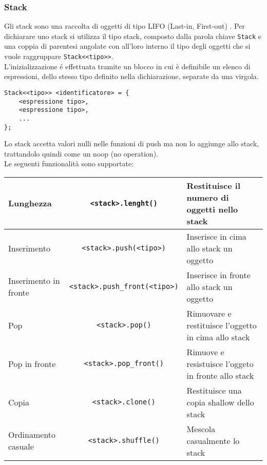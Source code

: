 \newpage
\subsubsection{Stack}
Gli stack sono una raccolta di oggetti di tipo LIFO (Last-in, First-out) \cite{CSharpLang}.
Per dichiarare uno stack si utilizza il tipo stack, composto dalla parola chiave \lstinline|Stack|
e una coppia di parentesi angolate con all'loro interno il tipo degli oggetti che si vuole raggruppare
\lstinline|Stack<<tipo>>|. \\
L'inizializzazione é effettuata tramite un blocco in cui è definibile un elenco di espressioni,
dello stesso tipo definito nella dichiarazione, separate da una virgola.
\begin{lstlisting}
Stack<<tipo>> <identificatore> = {
    <espressione tipo>,
    <espressione tipo>,
    ...
};
\end{lstlisting}
Lo stack accetta valori nulli nelle funzioni di push ma non lo aggiunge allo stack, trattandolo quindi
come un noop (no operation). \\ 
Le seguenti funzionalità sono supportate: 
\begin{center}
\begin{tabularx}{\linewidth}{|X|c|X|}
    \hline
    Lunghezza & \lstinline|<stack>.lenght()|& Restituisce il numero di oggetti nello stack \\
    \hline
    Inserimento & \lstinline|<stack>.push(<tipo>)| & Inserisce in cima allo stack un oggetto \\
    \hline
    Inserimento in fronte& \lstinline|<stack>.push_front(<tipo>)| & Inserisce in fronte allo stack un oggetto \\
    \hline
    Pop & \lstinline|<stack>.pop()| & Rimuovare e restituisce l'oggetto in cima allo stack\\
    \hline
    Pop in fronte& \lstinline|<stack>.pop_front()| & Rimuove e resistuisce l'oggeto in fronte allo stack\\
    \hline
    Copia & \lstinline|<stack>.clone()| & Restituisce una copia shallow dello stack \\
    \hline
    Ordinamento casuale & \lstinline|<stack>.shuffle()| & Mescola casualmente lo stack\\
    \hline
\end{tabularx}
\end{center}

\newpage
